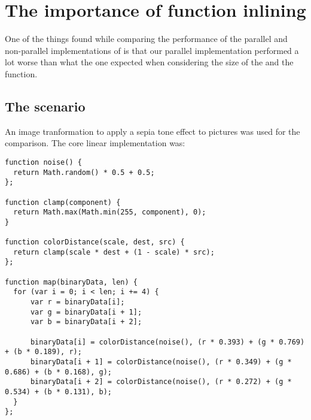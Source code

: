 \section{The importance of function inlining}
One of the things found while comparing the performance of the parallel and non-parallel implementations of  is that our parallel implementation performed a lot worse than what the one expected when considering the size of the \ttarray{} and the  function.

\subsection{The scenario}
An image tranformation to apply a sepia tone effect to pictures was used for the comparison. The core linear implementation was:
\begin{lstlisting}[caption=Sepia tone linear implementation]
function noise() {
  return Math.random() * 0.5 + 0.5;
};

function clamp(component) {
  return Math.max(Math.min(255, component), 0);
}

function colorDistance(scale, dest, src) {
  return clamp(scale * dest + (1 - scale) * src);
};

function map(binaryData, len) {
  for (var i = 0; i < len; i += 4) {
      var r = binaryData[i];
      var g = binaryData[i + 1];
      var b = binaryData[i + 2];

      binaryData[i] = colorDistance(noise(), (r * 0.393) + (g * 0.769) + (b * 0.189), r);
      binaryData[i + 1] = colorDistance(noise(), (r * 0.349) + (g * 0.686) + (b * 0.168), g);
      binaryData[i + 2] = colorDistance(noise(), (r * 0.272) + (g * 0.534) + (b * 0.131), b);
  }
};
\end{lstlisting}


